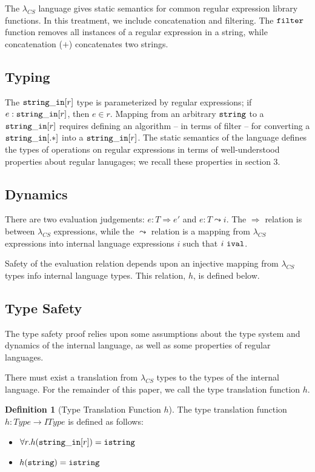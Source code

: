 \documentclass[10pt,preprint]{sigplanconf}
\theoremstyle{definition}
\newtheorem{defn}[thm]{Definition}
\newcommand{\strin}{{\tt string\_in}}
\newcommand{\str}{ {\tt string} }
\newcommand{\istr}{ {\tt istring} }
\newcommand{\reduces}{ \Rightarrow }
\newcommand{\ireduces}{ \leadsto }
\newcommand{\ival}{ \ {\tt ival} }
\newcommand{\lcs}{\lambda_{CS}}
\begin{document}
The $\lcs$ language gives static semantics for common regular expression library
functions. In this treatment, we include concatenation and filtering.
The ${\tt filter}$ function removes all instances of a regular expression in a string,
while concatenation ($+$) concatenates two strings.

\subsection{Typing}

The $\strin[r]$ type is parameterized by regular expressions; if $e:\strin[r]$,
then $e \in r$. Mapping from an arbitrary $\str$ to a $\strin[r]$ requires
defining an algorithm -- in terms of filter -- for converting a $\strin[.*]$
into a $\strin[r]$. The static semantics of the language defines the types of
operations on regular expressions in terms of well-understood properties about
regular lanugages; we recall these properties in section 3.

\subsection{Dynamics}

There are two evaluation judgements: $e:T \reduces e'$ and $e:T \ireduces i$.
The $\reduces$ relation is between $\lcs$ expressions, while the $\ireduces$
relation is a mapping from $\lcs$ expressions into internal language expressions
$i$ such that $i \ival$.

Safety of the evaluation relation depends upon an injective mapping from $\lcs$ types info
internal language types. This relation, $h$, is defined below.

\subsection{Type Safety}

The type safety proof relies upon some assumptions about the type system and
dynamics of the internal language, as well as some properties of regular
languages.

There must exist a translation from $\lcs$ types to the types of the internal
language. For the remainder of this paper, we call the type translation function
$h$.

\begin{defn}[Type Translation Function $h$]
  The type translation function $h : Type \rightarrow IType$ is defined as follows:
  \begin{itemize}
    \item $\forall r. h(\strin[r]) = \istr$
    \item $h(\str) = \istr$
  \end{itemize}
\end{defn}
\end{document}
